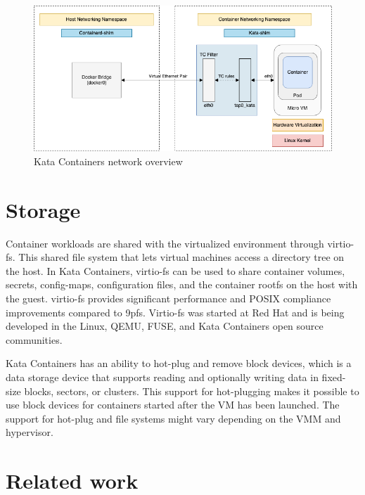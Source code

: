 \begin{figure}[ht]
  \begin{center}
    \includegraphics[width=13.5cm]{images/KataContainersNetwork.png}
    \caption{Kata Containers network overview \cite{KataContainersArchitecture}}
    \label{fig:KataContainersNetwork}
  \end{center}
\end{figure}

\section{Storage}

Container workloads are shared with the virtualized environment through virtio-fs. This shared file system that lets virtual machines access a directory tree on the host. In Kata Containers, virtio-fs can be used to share container volumes, secrets, config-maps, configuration files, and the container rootfs on the host with the guest. virtio-fs provides significant performance and POSIX compliance improvements compared to 9pfs. Virtio-fs was started at Red Hat and is being developed in the Linux, QEMU, FUSE, and Kata Containers open source communities. \cite{virtio-fs-Kata}\cite{virtio-fs}

Kata Containers has an ability to hot-plug and remove block devices, which is a data storage device that supports reading and optionally writing data in fixed-size blocks, sectors, or clusters. This support for hot-plugging makes it possible to use block devices for containers started after the VM has been launched. The support for hot-plug and file systems might vary depending on the VMM and hypervisor. \cite{KataContainersArchitecture}\cite{KataContainersVirtualization}

\section{Related work}

